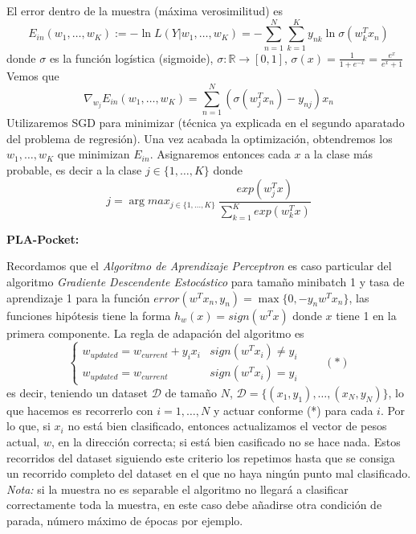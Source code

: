 \documentclass[11pt,a4paper]{article}
\theoremstyle{definition}
\newcommand{\R}{\mathbb{R}}
\begin{document}
	
	El error dentro de la muestra (máxima verosimilitud) es
	$$E_{in}(w_1,\ldots,w_K):=-\ln L(Y|w_1,\ldots ,w_K)=-\sum_{n=1}^N \sum_{k=1}^K y_{nk} \ln \sigma(w_k^T x_n)$$
	donde $\sigma$ es la función logística (sigmoide), $\sigma\colon \R \to [0,1]$, $\sigma(x)=\frac{1}{1+e^{-x}}=\frac{e^x}{e^x+1}$\\
	Vemos que
	$$\nabla_{w_j} E_{in}(w_1,\ldots,w_K)=\sum_{n=1}^N (\sigma(w_j^T x_n)-y_{nj}) x_n$$
	Utilizaremos SGD para minimizar (técnica ya explicada en el segundo aparatado del problema de regresión). Una vez acabada la optimización, obtendremos los $w_1,\ldots ,w_K$ que minimizan $E_{in}$. %
	 Asignaremos entonces cada $x$ a la clase más probable, es decir a la clase $j\in \{1,\ldots,K\}$ donde
	 $$j= \arg max_{j\in \{1,\ldots, K\}} \  \frac{exp(w_j^Tx)}{\sum_{k=1}^K exp(w_k^Tx)}$$
	
	\textbf{PLA-Pocket:} $\quad \quad \quad \quad \quad \quad \quad \quad \quad \quad \quad \quad \quad \quad \quad \quad \quad \quad \quad \quad \quad \quad \quad \quad \quad \quad \quad \quad  \quad $ %
	
	Recordamos que el \textit{Algoritmo de Aprendizaje Perceptron} es caso particular del algoritmo \textit{Gradiente Descendente Estocástico} para tamaño minibatch 1 y tasa de aprendizaje 1 para la función $error(w^T x_n, y_n)=\max \{0, -y_n w^T x_n\}$, las funciones hipótesis tiene la forma $h_w(x)=sign(w^Tx)$ donde $x$ tiene 1 en la primera componente.
    La regla de adapación del algoritmo es 
		$$\begin{cases}
		w_{updated} = w_{current} +y_ix_i & sign(w^Tx_i) \neq y_i\\
		w_{updated} = w_{current} & sign(w^Tx_i) = y_i
		\end{cases} \quad \quad (*)$$
		es decir, teniendo un dataset $\mathcal{D}$ de tamaño $N$, $\mathcal{D}=\{(x_1,y_1),\ldots,(x_N,y_N)\}$, lo que hacemos es recorrerlo con $i=1,\ldots, N$ y actuar conforme (*) para cada $i$. Por lo que, si $x_i$ no está bien clasificado, entonces actualizamos el vector de pesos actual, $w$, en la dirección correcta; si está bien casificado no se hace nada. Estos recorridos del dataset siguiendo este criterio los repetimos hasta que se consiga un recorrido completo del dataset en el que no haya ningún punto mal clasificado.\\
		\textit{Nota:} si la muestra no es separable el algoritmo no llegará a clasificar correctamente toda la muestra, en este caso debe añadirse otra condición de parada, número máximo de épocas por ejemplo.\\
		
\end{document}
